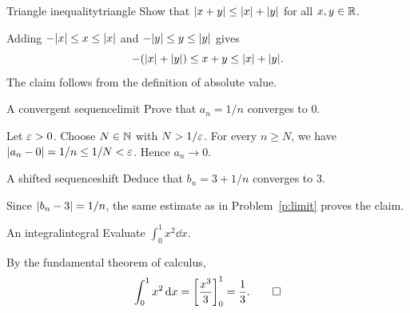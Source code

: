 \documentclass[11pt,letterpaper]{article}
\begin{document}
\makeassignmentheader

\begin{problem}{Triangle inequality}{triangle}
Show that $\lvert x+y\rvert\leq\lvert x\rvert+\lvert y\rvert$ for all $x,y\in\mathbb{R}$.
\end{problem}
\begin{solution}
Adding $-\lvert x\rvert\leq x\leq\lvert x\rvert$ and
$-\lvert y\rvert\leq y\leq\lvert y\rvert$ gives
\[
  -(\lvert x\rvert+\lvert y\rvert)\leq x+y\leq\lvert x\rvert+\lvert y\rvert.
\]
The claim follows from the definition of absolute value.
\end{solution}

\begin{subproblems}
\begin{problem}{A convergent sequence}{limit}
Prove that $a_n=1/n$ converges to $0$.
\end{problem}
\begin{solution}
Let $\varepsilon>0$. Choose $N\in\mathbb{N}$ with $N>1/\varepsilon$.
For every $n\geq N$, we have $\lvert a_n-0\rvert=1/n\leq1/N<\varepsilon$.
Hence $a_n\to0$.
\end{solution}

\begin{problem}{A shifted sequence}{shift}
Deduce that $b_n=3+1/n$ converges to $3$.
\end{problem}
\begin{solution}
Since $\lvert b_n-3\rvert=1/n$, the same estimate as in
Problem~\ref{p:limit} proves the claim.
\end{solution}
\end{subproblems}

\begin{problem}{An integral}{integral}
Evaluate $\int_0^1 x^2\dd x$.
\end{problem}
\begin{solution}
By the fundamental theorem of calculus,
\[
  \int_0^1 x^2\mathop{}\!\mathrm{d} x=\left[\frac{x^3}{3}\right]_0^1=\frac13.\qedhere
\]
\end{solution}
\end{document}
